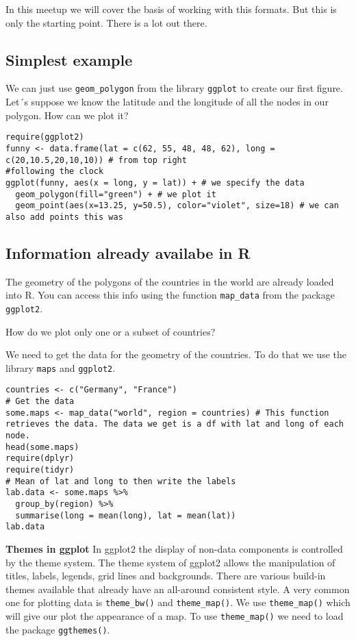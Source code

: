\documentclass[
]{book}
\theoremstyle{definition}
\theoremstyle{definition}
\theoremstyle{definition}
\theoremstyle{definition}
\theoremstyle{remark}
\begin{document}
In this meetup we will cover the basis of working with this formats. But this is only the starting point. There is a lot out there.

\hypertarget{simplest-example}{%
\subsection{Simplest example}\label{simplest-example}}

We can just use \texttt{geom\_polygon} from the library \texttt{ggplot} to create our first figure. Let´s suppose we know the latitude and the longitude of all the nodes in our polygon. How can we plot it?

\begin{verbatim}
require(ggplot2)
funny <- data.frame(lat = c(62, 55, 48, 48, 62), long = c(20,10.5,20,10,10)) # from top right 
#following the clock
ggplot(funny, aes(x = long, y = lat)) + # we specify the data
  geom_polygon(fill="green") + # we plot it
  geom_point(aes(x=13.25, y=50.5), color="violet", size=18) # we can also add points this was
\end{verbatim}

\hypertarget{information-already-availabe-in-r}{%
\subsection{Information already availabe in R}\label{information-already-availabe-in-r}}

The geometry of the polygons of the countries in the world are already loaded into R. You can access this info using the function \texttt{map\_data} from the package \texttt{ggplot2}.

How do we plot only one or a subset of countries?

We need to get the data for the geometry of the countries. To do that we use the library \texttt{maps} and \texttt{ggplot2}.

\begin{verbatim}
countries <- c("Germany", "France")
# Get the data
some.maps <- map_data("world", region = countries) # This function retrieves the data. The data we get is a df with lat and long of each node. 
head(some.maps)
require(dplyr)
require(tidyr)
# Mean of lat and long to then write the labels 
lab.data <- some.maps %>%
  group_by(region) %>%
  summarise(long = mean(long), lat = mean(lat))
lab.data
\end{verbatim}

\textbf{Themes in ggplot} In ggplot2 the display of non-data components is controlled by the theme system. The theme system of ggplot2 allows the manipulation of titles, labels, legends, grid lines and backgrounds. There are various build-in themes available that already have an all-around consistent style. A very common one for plotting data is \texttt{theme\_bw()} and \texttt{theme\_map()}. We use \texttt{theme\_map()} which will give our plot the appearance of a map. To use \texttt{theme\_map()} we need to load the package \texttt{ggthemes()}.
\end{document}
